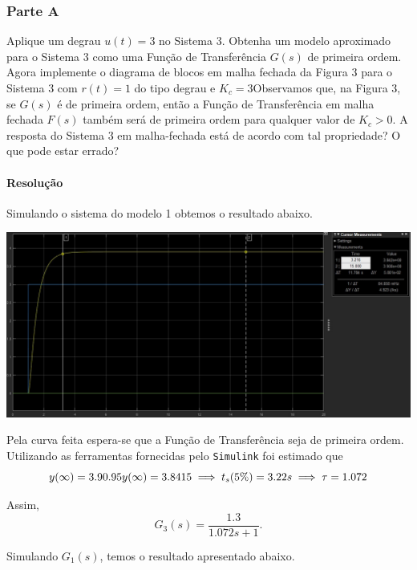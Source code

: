 \documentclass[
]{book}
\begin{document}
\hypertarget{parte-a}{%
\subsubsection*{Parte A}\label{parte-a}}

Aplique um degrau \(u(t) = 3\) no Sistema 3. Obtenha um modelo aproximado para o Sistema 3 como uma Função de Transferência \(G(s)\) de primeira ordem. Agora implemente o diagrama de blocos em malha fechada da Figura 3 para o Sistema 3 com \(r(t) = 1\) do tipo degrau e \(K_c = 3\)Observamos que, na Figura 3, se \(G(s)\) é de primeira ordem, então a Função de Transferência em malha fechada \(F(s)\) também será de primeira ordem para qualquer valor de \(K_c > 0\). A resposta do Sistema 3 em malha-fechada está de acordo com tal propriedade? O que pode estar errado?

\hypertarget{resoluuxe7uxe3o-8}{%
\paragraph*{Resolução}\label{resoluuxe7uxe3o-8}}

Simulando o sistema do modelo 1 obtemos o resultado abaixo.

\includegraphics{Imagens/Lab3/Resolução/prob3AA.jpg}

Pela curva feita espera-se que a Função de Transferência seja de primeira ordem. Utilizando as ferramentas fornecidas pelo \texttt{Simulink} foi estimado que
\[
y(\infty) = 3.9 \\
0.95y(\infty) = 3.8415 \implies  t_s(5\%) = 3.22s \implies \tau = 1.072
\]

Assim,
\[
G_3(s) = \frac {1.3}{1.072s+1}.
\]

Simulando \(G_1(s)\), temos o resultado apresentado abaixo.
\end{document}
